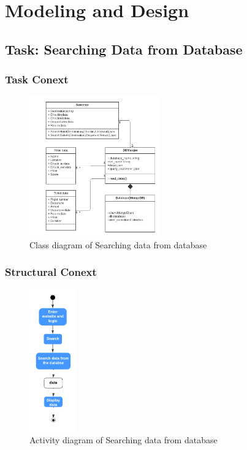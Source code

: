 \documentclass[conference]{IEEEtran}
\begin{document}
\section{\textbf{Modeling and Design}}


\subsection{\textbf{Task: Searching Data from Database }}


\subsubsection{\textbf{Task Conext }}

\begin{figure}[htbp]
	\centerline{\includegraphics[width=0.5\textwidth]{image/searching hotel class1.pdf}}
	\caption{Class diagram of Searching data from database }
	\label{class1}
\end{figure}

\subsubsection{\textbf{Structural Conext }}

\begin{figure}[htbp]
	\centerline{\includegraphics[width=0.18\textwidth]{image/searching hotel activity1.pdf}}
	\caption{Activity diagram of Searching data from database }
	\label{activity1}
\end{figure}
\end{document}
